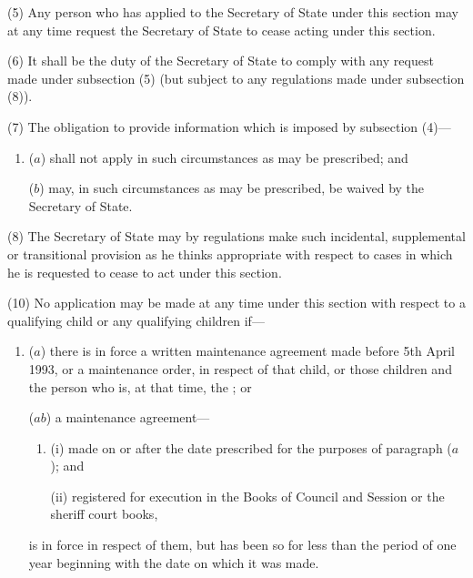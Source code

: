 \documentclass[a4paper]{article}
\begin{document}
(5)
Any person who has applied to the Secretary of State under this section may
at any time request the Secretary of State to cease acting under this section.

(6)
It shall be the duty of the Secretary of State to comply with any request
made under subsection (5) (but subject to any regulations made under subsection
(8)).

(7)
The obligation to provide information which is imposed by subsection (4)---
\begin{enumerate}\item[]
($a$)
shall not apply in such circumstances as may be prescribed; and

($b$)
may, in such circumstances as may be prescribed, be waived by the Secretary of State.
\end{enumerate}

(8)
The Secretary of State may by regulations make such incidental, supplemental or transitional provision as he thinks appropriate with respect to cases
in which he is requested to cease to act under this section.

(10) No
application may be made at any time under this section with respect
to a qualifying child or any qualifying children if---
\begin{enumerate}\item[]
($a$)
there is in force a written maintenance agreement made before 5th April
1993, or a maintenance order, in respect
of that child, or those children and the person who is, at that time, the ; or


($ab$) a
maintenance agreement---
\begin{enumerate}\item[]
(i)
made on or after the date prescribed for the purposes of paragraph ($a$);
and

(ii)
registered for execution in the Books of Council and Session or the
sheriff court books,
\end{enumerate}
is in force in respect of them, but has been so for less than the period of one year
beginning with the date on which it was made.
\end{enumerate}
\end{document}
